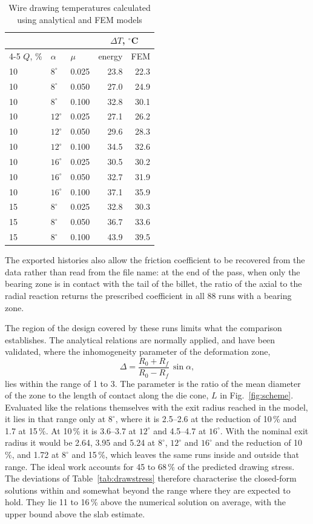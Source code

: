 \documentclass[pdflatex,sn-basic,Numbered]{sn-jnl}
\begin{document}
\begin{table}[htbp]
\centering
\caption{Wire drawing temperatures calculated using analytical and FEM models}
\label{tab:deltaT}
\begin{tabular}{@{}lllrr@{}}
\toprule
 & & & \multicolumn{2}{c}{$\Delta T$, $^\circ$C} \\
\cmidrule(l){4-5}
$Q$, \% & $\alpha$ & $\mu$ & energy & FEM \\
\midrule
10 & $8^\circ$  & 0.025 & 23.8 & 22.3 \\
10 & $8^\circ$  & 0.050 & 27.0 & 24.9 \\
10 & $8^\circ$  & 0.100 & 32.8 & 30.1 \\
10 & $12^\circ$ & 0.025 & 27.1 & 26.2 \\
10 & $12^\circ$ & 0.050 & 29.6 & 28.3 \\
10 & $12^\circ$ & 0.100 & 34.5 & 32.6 \\
10 & $16^\circ$ & 0.025 & 30.5 & 30.2 \\
10 & $16^\circ$ & 0.050 & 32.7 & 31.9 \\
10 & $16^\circ$ & 0.100 & 37.1 & 35.9 \\
15 & $8^\circ$  & 0.025 & 32.8 & 30.3 \\
15 & $8^\circ$  & 0.050 & 36.7 & 33.6 \\
15 & $8^\circ$  & 0.100 & 43.9 & 39.5 \\
\bottomrule
\end{tabular}
\end{table}

The exported histories also allow the friction coefficient to be recovered from the data rather
than read from the file name: at the end of the pass, when only the bearing zone is in contact with the
tail of the billet, the ratio of the axial to the radial reaction returns the prescribed
coefficient in all 88 runs with a bearing zone.

The region of the design covered by these runs limits what the comparison establishes. The
analytical relations are normally applied, and have been validated, where the inhomogeneity
parameter of the deformation zone,
\begin{equation}
\Delta = \frac{R_0+R_f}{R_0-R_f}\,\sin\alpha,
\label{eq:delta}
\end{equation}
lies within the range of 1 to 3. The parameter is the ratio of the mean diameter of the zone to
the length of contact along the die cone, $L$ in Fig.~\ref{fig:scheme}. Evaluated like the
relations themselves with the exit radius reached in the model, it lies in that range only at
$8^\circ$, where it is
2.5--2.6 at the reduction of 10\,\% and 1.7 at 15\,\%. At 10\,\% it is 3.6--3.7 at $12^\circ$
and 4.5--4.7 at $16^\circ$. With the nominal exit radius it would be 2.64, 3.95 and 5.24 at
$8^\circ$, $12^\circ$ and $16^\circ$ and the reduction of 10\,\%, and 1.72 at $8^\circ$ and 15\,\%,
which leaves the same runs inside and outside that range.
The ideal work accounts for 45 to 68\,\% of the predicted drawing
stress. The deviations of Table~\ref{tab:drawstress} therefore characterise the closed-form
solutions within and somewhat beyond the range where they are expected to hold. They lie 11 to
16\,\% above the numerical solution on average, with the upper bound above the slab estimate.
\end{document}
